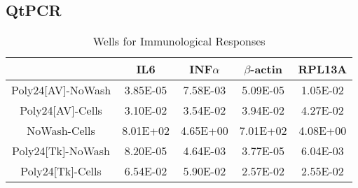 \documentclass[journal, a4paper]{IEEEtran}
\begin{document}

  \subsection{QtPCR}

    \begin{table}[!hbt]
      \begin{center}
      \caption{Wells for Immunological Responses}
      \label{tab:simParameters}
      \begin{tabular}{|c|c|c|c|c|}
        \hline
        & IL6 & INF$\alpha$ & $\beta$-actin & RPL13A \\
        \hline
        Poly24[AV]-NoWash & 3.85E-05 & 7.58E-03 & 5.09E-05 & 1.05E-02 \\
        \hline
        Poly24[AV]-Cells & 3.10E-02 & 3.54E-02 & 3.94E-02 & 4.27E-02 \\
        \hline
        NoWash-Cells & 8.01E+02 & 4.65E+00 & 7.01E+02 & 4.08E+00 \\
        \hline
        Poly24[Tk]-NoWash & 8.20E-05 & 4.64E-03 & 3.77E-05 & 6.04E-03\\
        \hline
        Poly24[Tk]-Cells & 6.54E-02 & 5.90E-02 & 2.57E-02 & 2.55E-02\\
        \hline
      \end{tabular}
      \end{center}
    \end{table}
\end{document}
